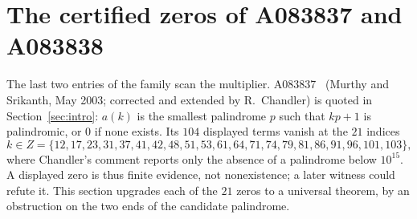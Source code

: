 \providecommand{\revW}{\mathrm{rev}}
\makeatletter
{}
\makeatother

\section{The certified zeros of A083837 and A083838}
\label{sec:zeros}

The last two entries of the family scan the multiplier.
A083837~\cite{oeis} (Murthy and Srikanth, May 2003;
corrected and extended by R.~Chandler) is quoted in
Section~\ref{sec:intro}: $a(k)$ is the smallest
palindrome $p$ such that $kp+1$ is palindromic, or $0$
if none exists. Its $104$ displayed terms vanish at the
$21$ indices
\[
 k \in Z = \{12,17,23,31,37,41,42,48,51,53,61,64,71,
 74,79,81,86,91,96,101,103\},
\]
where Chandler's comment reports only the absence of a
palindrome below $10^{15}$. A displayed zero is thus
finite evidence, not nonexistence; a later witness could
refute it. This section upgrades each of the $21$ zeros
to a universal theorem, by an obstruction on the two
ends of the candidate palindrome.

